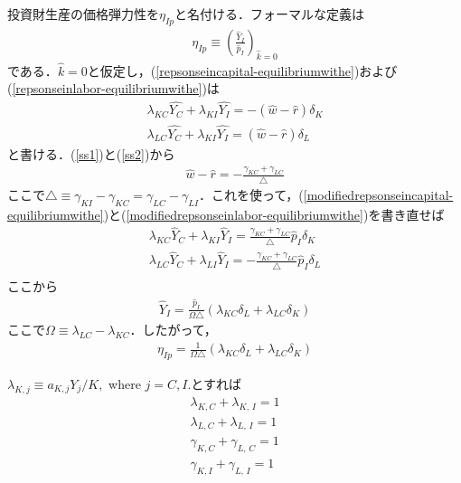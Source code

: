 \documentclass[12pt,a4paper]{jsarticle}
\begin{document}
投資財生産の価格弾力性を$\eta_{Ip}$と名付ける．フォーマルな定義は
\begin{align}
	\eta_{Ip} \equiv \left( \frac{\hat{Y}_{I}}{\hat{p}_{I}} \right)_{\hat{k}=0}
\end{align}
である．$\hat{k}=0$と仮定し，(\ref{repsonseincapital-equilibriumwithe})および(\ref{repsonseinlabor-equilibriumwithe})は
\begin{align}
	\lambda_{KC} \hat{Y_{C}}  +\lambda_{KI} \hat{Y_{I}}  =  -(\hat{w} - \hat{r}) \delta_{K}  \label{modifiedrepsonseincapital-equilibriumwithe}\\
	\lambda_{LC} \hat{Y_{C}}  +\lambda_{KI} \hat{Y_{I}}  = (\hat{w} - \hat{r}) \delta_{L}\label{modifiedrepsonseinlabor-equilibriumwithe}
\end{align}
と書ける．(\ref{ss1})と(\ref{ss2})から
\begin{align}
	\hat{w} -\hat{r} =- \frac{\gamma_{KC}+\gamma_{LC}}{\triangle}
\end{align}
ここで$\triangle \equiv \gamma_{KI} -\gamma_{KC} = \gamma_{LC} - \gamma_{LI}$．これを使って，(\ref{modifiedrepsonseincapital-equilibriumwithe})と(\ref{modifiedrepsonseinlabor-equilibriumwithe})を書き直せば
\begin{align}
	\lambda_{KC} \hat{Y}_{C} + \lambda_{KI} \hat{Y}_{I} = \frac{\gamma_{KC}+\gamma_{LC}}{\triangle} \hat{p}_{I} \delta_{K} \\
	\lambda_{LC} \hat{Y}_{C} + \lambda_{LI} \hat{Y}_{I} = - \frac{\gamma_{KC}+\gamma_{LC}}{\triangle} \hat{p}_{I} \delta_{L} \\
\end{align}
ここから
\begin{align}
	\hat{Y}_{I} = \frac{\hat{p}_{I}}{\Omega \triangle} \left(\lambda_{KC} \delta_{L} + \lambda_{LC} \delta_{K} \right)
\end{align}
ここで$\Omega \equiv \lambda_{LC} - \lambda_{KC}$．したがって，
\begin{align}
	\eta_{Ip} = \frac{1}{\Omega \triangle} \left(\lambda_{KC} \delta_{L} + \lambda_{LC} \delta_{K} \right) \label{eq:8}
\end{align}

$\lambda_{K,j} \equiv a_{K,j} Y_{j}/K, $ where $j=C, I$.とすれば
\begin{align}
 \lambda_{K,C} +\lambda_{K, \, I} =1 \label{normalizedcapitalequilibrium} \\
\lambda_{L,C} +\lambda_{L, \, I} =1 \label{normalizedlaborequilibrium}\\
\gamma_{K,C} +\gamma_{L, \, C} =1  \label{normalizeddistrbutioninc}\\
\gamma_{K,I} +\gamma_{L, \, I} =1 \label{normalizeddistrbutionini}
\end{align}
\end{document}
